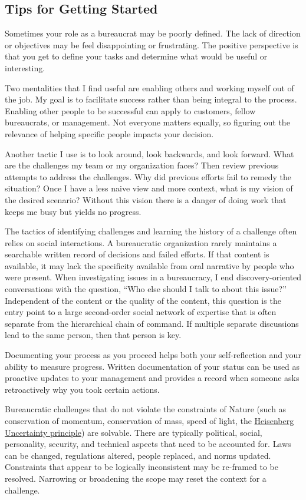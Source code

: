 \subsection{Tips for Getting Started}

Sometimes your role as a bureaucrat may be poorly defined. The lack of direction or objectives may be feel disappointing or frustrating. The positive perspective is that you get to define your tasks and determine what would be useful or interesting. 

Two mentalities that I find useful are enabling others and working myself out of the job. My goal is to facilitate success rather than being integral to the process. Enabling other people to be successful can apply to customers, fellow bureaucrats, or management. Not everyone matters equally, so figuring out the relevance of helping specific people impacts your decision. 

Another tactic I use is to look around, look backwards, and look forward. What are the challenges my team or my organization faces? Then review previous attempts to address the challenges. Why did previous efforts fail to remedy the situation? Once I have a less naive view and more context, what is my vision of the desired scenario? Without this vision there is a danger of doing work that keeps me busy but yields no progress. 

The tactics of identifying challenges and learning the history of a challenge often relies on social interactions. A bureaucratic organization rarely maintains a searchable written record of decisions and failed efforts. If that content is available, it may lack the specificity available from oral narrative by people who were present. When investigating issues in a bureaucracy, I end discovery-oriented conversations with the question, ``Who else should I talk to about this issue?'' Independent of the content or the quality of the content, this question is the entry point to a large second-order social network of expertise that is often separate from the hierarchical chain of command. If multiple separate discussions lead to the same person, then that person is key. 

Documenting your process as you proceed helps both your self-reflection and your ability to measure progress. Written documentation of your status can be used as proactive updates to your management and provides a record when someone asks retroactively why you took certain actions.

Bureaucratic challenges that do not violate the constraints of Nature (such as conservation of momentum, conservation of mass, speed of light, the \href{https://en.wikipedia.org/wiki/Uncertainty_principle}{Heisenberg Uncertainty principle}) are solvable. There are typically political, social, personality, security, and technical aspects that need to be accounted for. Laws can be changed, regulations altered, people replaced, and norms updated. Constraints that appear to be logically inconsistent may be re-framed to be resolved. Narrowing or broadening the scope may reset the context for a challenge.



